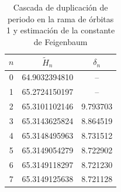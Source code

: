 \begin{table}[htbp]
    \centering
    \begin{tabular}{c c c}
        \hline
        $n$ & $\tilde{H}_n$ & $\delta_n$ \\
        \hline
        0   & 64.9032394810 & --         \\
        1   & 65.2724150197 & --         \\
        2   & 65.3101102146 & 9.793703   \\
        3   & 65.3143625824 & 8.864519   \\
        4   & 65.3148495963 & 8.731512   \\
        5   & 65.3149054279 & 8.722902   \\
        6   & 65.3149118297 & 8.721230   \\
        7   & 65.3149125638 & 8.721128   \\
        \hline
    \end{tabular}
    \caption{Cascada de duplicación de periodo en la rama de órbitas 1 y estimación de la constante de Feigenbaum}
    \label{tab:FlipCascade1}
\end{table}
